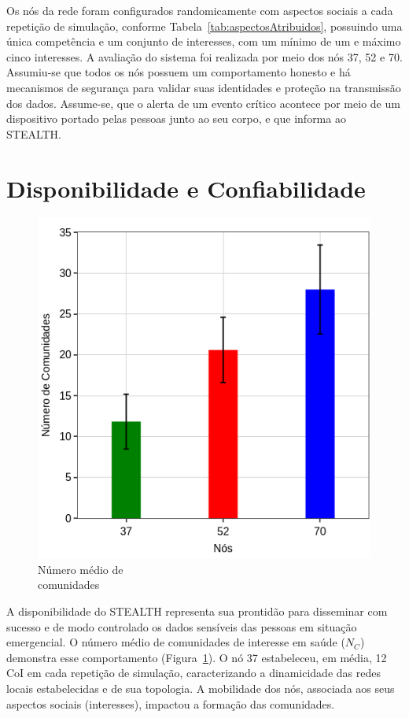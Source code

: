 \documentclass[12pt]{article}
\begin{document}
Os nós da rede foram configurados randomicamente com aspectos sociais a cada repetição de simulação, conforme Tabela~\ref{tab:aspectosAtribuidos}, possuindo uma única competência e um conjunto de interesses, com um mínimo de um e máximo cinco interesses. A avaliação do sistema foi realizada por meio dos nós 37, 52 e 70.
Assumiu-se que todos os nós possuem um comportamento honesto e há mecanismos de segurança para validar suas identidades e proteção na transmissão dos dados. Assume-se, que o alerta de um evento crítico acontece por meio de um dispositivo portado pelas pessoas junto ao seu corpo, e que informa ao \mbox{STEALTH}.



\section{Disponibilidade e Confiabilidade} \label{sec:results}

\begin{figure}
\centering
\includegraphics[width=.35\textwidth]{figures/coi_mean_performance_3_SBSEG19_v2.png}
\vspace{-0.5cm}
\caption[Número médio de comunidades]
{Número médio de \\ comunidades\endtabular}
\label{fig:coiEstabelecidas}
\end{figure}    

A disponibilidade do \mbox{STEALTH} representa sua prontidão para disseminar com sucesso e de modo controlado os dados sensíveis das pessoas em situação emergencial. O número médio de comunidades de interesse em saúde ($N_{C}$) demonstra esse comportamento (Figura~\ref{fig:coiEstabelecidas}). O nó 37 estabeleceu, em média, 12 CoI em cada repetição de simulação, caracterizando a dinamicidade das redes locais estabelecidas e de sua topologia. A mobilidade dos nós, associada aos seus aspectos sociais (interesses), impactou a formação das comunidades.
\end{document}

